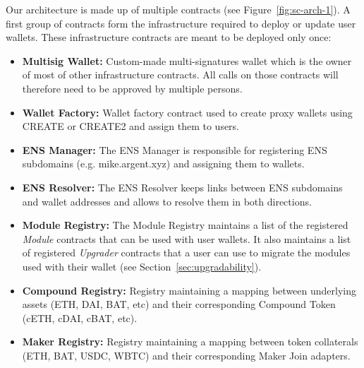 \documentclass[12pt]{article}
\begin{document}

Our architecture is made up of multiple contracts (see Figure~\ref{fig:sc-arch-1}). A first group of contracts form the infrastructure required to deploy or update user wallets. These infrastructure contracts are meant to be deployed only once:
\begin{itemize}
    \item \textbf{Multisig Wallet:} Custom-made multi-signatures wallet which is the owner of most of other infrastructure contracts. All calls on those contracts will therefore need to be approved by multiple persons.
    \item \textbf{Wallet Factory:} Wallet factory contract used to create proxy wallets using CREATE or CREATE2 and assign them to users.
    \item \textbf{ENS Manager:} The ENS Manager is responsible for registering ENS subdomains (e.g. mike.argent.xyz) and assigning them to wallets.
    \item \textbf{ENS Resolver:} The ENS Resolver keeps links between ENS subdomains and wallet addresses and allows to resolve them in both directions.
    \item \textbf{Module Registry:} The Module Registry maintains a list of the registered \emph{Module} contracts that can be used with user wallets. It also maintains a list of registered \emph{Upgrader} contracts that a user can use to migrate the modules used with their wallet (see Section~\ref{sec:upgradability}).
    \item \textbf{Compound Registry:} Registry maintaining a mapping between underlying assets (ETH, DAI, BAT, etc) and their corresponding Compound Token (cETH, cDAI, cBAT, etc).
    \item \textbf{Maker Registry:} Registry maintaining a mapping between token collaterals (ETH, BAT, USDC, WBTC) and their corresponding Maker Join adapters.
\end{itemize}
\end{document}
